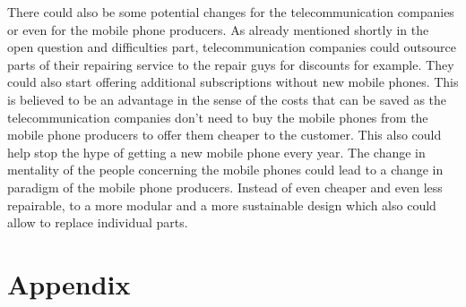 \documentclass[11pt]{scrartcl}
\begin{document}
There could also be some potential changes for the telecommunication companies or even for the mobile phone producers. As already mentioned shortly in the open question and difficulties part, telecommunication companies could outsource parts of their repairing service to the repair guys for discounts for example. They could also start offering additional subscriptions without new mobile phones. This is believed to be an advantage in the sense of the costs that can be saved as the telecommunication companies don't need to buy the mobile phones from the mobile phone producers to offer them cheaper to the customer. This also could help stop the hype of getting a new mobile phone every year. The change in mentality of the people concerning the mobile phones could lead to a change in paradigm of the mobile phone producers. Instead of even cheaper and even less repairable, to a more modular and a more sustainable design which also could allow to replace individual parts.

\printbibliography%

\pagebreak
\section*{Appendix}
\end{document}
